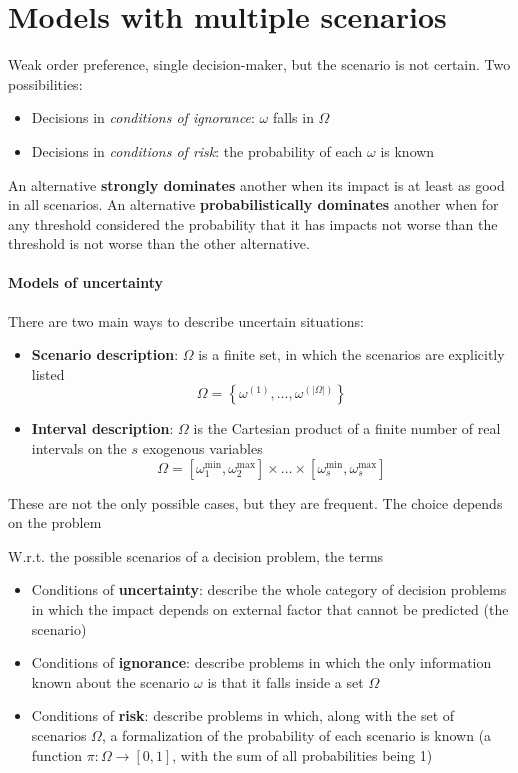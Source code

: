 \section{Models with multiple scenarios}

Weak order preference, single decision-maker, but the scenario is not certain. Two possibilities: 
\begin{itemize}
	\item Decisions in \textit{conditions of ignorance}: $\omega$ falls in $\Omega$
	
	\item Decisions in \textit{conditions of risk}: the probability of each $\omega$ is known
\end{itemize}

An alternative \textbf{strongly dominates} another when its impact is at least as good in all scenarios. An alternative \textbf{probabilistically dominates} another when for any threshold considered the probability that it has impacts not worse than the threshold is not worse than the other alternative.

\paragraph{Models of uncertainty} There are two main ways to describe uncertain situations: 
\begin{itemize}
	\item \textbf{Scenario description}: $\Omega$ is a finite set, in which the scenarios are explicitly listed
	$$\Omega = \left\{\omega^{(1)}, \dots, \omega^{(|\Omega|)}\right\} $$
	
	\item \textbf{Interval description}: $\Omega$ is the Cartesian product of a finite number of real intervals on the $s$ exogenous variables 
	$$ \Omega = [\omega_1^{\min}, \omega_2^{\max}] \times  \dots  \times [\omega_s^{\min}, \omega_s^{\max}] $$
\end{itemize}

These are not the only possible cases, but they are frequent. The choice depends on the problem

W.r.t. the possible scenarios of a decision problem, the terms
\begin{itemize}
	\item Conditions of \textbf{uncertainty}: describe the whole category of decision problems in which the impact depends on external factor that cannot be predicted (the scenario)
	
	\item Conditions of \textbf{ignorance}: describe problems in which the only information known about the scenario $\omega$ is that it falls inside a set $\Omega$
	
	\item Conditions of \textbf{risk}: describe problems in which, along with the set of scenarios $\Omega$, a formalization of the probability of each scenario is known (a function $\pi: \Omega \rightarrow [0,1]$, with the sum of all probabilities being 1)
\end{itemize}

